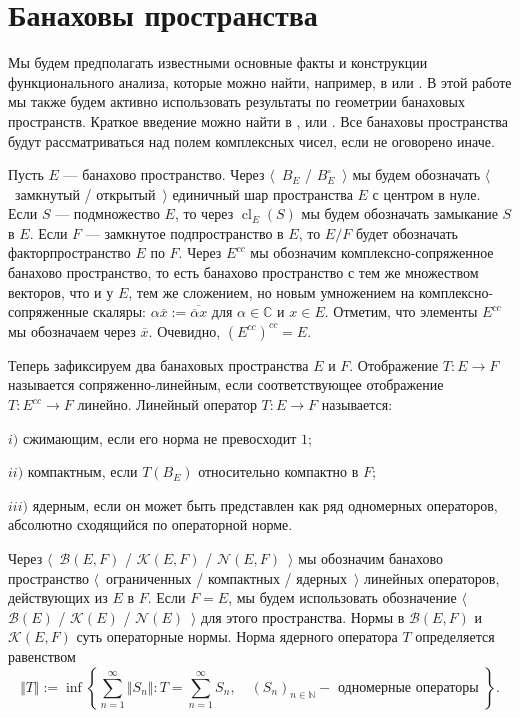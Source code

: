 
\section{Банаховы пространства}
\label{SectionBanachSpaces}

Мы будем предполагать известными основные факты и конструкции функционального анализа, которые можно найти, например, в \cite{HelLectAndExOnFuncAn} или \cite{ConwACoursInFuncAn}. В этой работе мы также будем активно использовать результаты по геометрии банаховых пространств. Краткое введение можно найти в \cite{CarothShortCourseBanSp}, \cite{KalAlbTopicsBanSpTh} или \cite{FabHabBanSpTh}. Все банаховы пространства будут рассматриваться над полем комплексных чисел, если не оговорено иначе.

Пусть $E$ --- банахово пространство. Через $\langle$~$B_E$ / $B_E^\circ$~$\rangle$ мы будем обозначать $\langle$~замкнутый / открытый~$\rangle$ единичный шар пространства $E$ с центром в нуле. Если $S$  --- подмножество $E$, то через $\operatorname{cl}_E(S)$ мы будем обозначать замыкание $S$ в $E$. Если $F$ --- замкнутое подпространство в $E$, то $E/F$ будет обозначать факторпространство $E$ по $F$. Через $E^{cc}$ мы обозначим комплексно-сопряженное банахово пространство, то есть банахово пространство с тем же множеством векторов, что и у $E$, тем же сложением, но новым умножением на комплексно-сопряженные скаляры: $\alpha \overline{x}:=\overline{\overline{\alpha}x}$ для $\alpha\in\mathbb{C}$ и $x\in E$. Отметим, что элементы $E^{cc}$ мы обозначаем через $\overline{x}$. Очевидно, $(E^{cc})^{cc}=E$.

Теперь зафиксируем два банаховых пространства $E$ и $F$. Отображение $T:E\to F$ называется сопряженно-линейным, если соответствующее отображение $T:E^{cc}\to F$ линейно. Линейный оператор $T:E\to F$ называется:

$i)$ сжимающим, если его норма не превосходит $1$;

$ii)$ компактным, если $T(B_E)$ относительно компактно в $F$;

$iii)$ ядерным, если он может быть представлен как ряд одномерных операторов, абсолютно сходящийся по операторной норме.

Через $\langle$~$\mathcal{B}(E,F)$ / $\mathcal{K}(E,F)$ / $\mathcal{N}(E,F)$~$\rangle$ мы обозначим банахово пространство $\langle$~ограниченных / компактных / ядерных~$\rangle$ линейных операторов, действующих из $E$ в $F$. Если $F=E$, мы будем использовать обозначение $\langle$~$\mathcal{B}(E)$ / $\mathcal{K}(E)$ / $\mathcal{N}(E)$~$\rangle$ для этого пространства. Нормы в $\mathcal{B}(E,F)$ и $\mathcal{K}(E,F)$ суть операторные нормы. Норма ядерного оператора $T$ определяется равенством
$$
\Vert T\Vert:=\inf\left\{\sum_{n=1}^\infty\Vert S_n\Vert: T=\sum_{n=1}^\infty S_n,\quad (S_n)_{n\in\mathbb{N}} - \mbox{ одномерные операторы }\right\}.
$$

